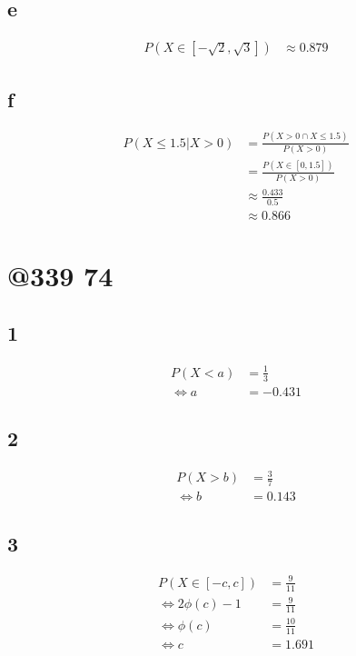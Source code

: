 \documentclass{article}
\newcommand{\equa}[1]{\begin{equation*}\begin{split}#1\end{split}\end{equation*}}
\begin{document}
\subsection*{e}
\equa{
	P(X \in [-\sqrt{2}, \sqrt{3}]) &\approx 0.879
}
\subsection*{f}
\equa{
	P(X \leq 1.5 | X > 0) &= \frac{P(X > 0 \cap X \leq 1.5)}{P(X > 0)} \\
			      &= \frac{P(X \in [0, 1.5])}{P(X > 0)} \\
			      &\approx \frac{0.433}{0.5} \\
			      &\approx 0.866 
}



\section*{@339 74}
\subsection*{1}
\equa{
	P(X < a) &= \frac{1}{3} \\
	\iff  a  &= -0.431
}
\subsection*{2}
\equa{
	P(X > b) &= \frac{3}{7} \\
	\iff  b  &= 0.143
}
\subsection*{3}
\equa{
	P(X \in [-c, c]) &= \frac{9}{11} \\
	\iff 2\phi(c) - 1 &= \frac{9}{11} \\
	\iff \phi(c) &= \frac{10}{11} \\
	\iff c &= 1.691
}
\end{document}
